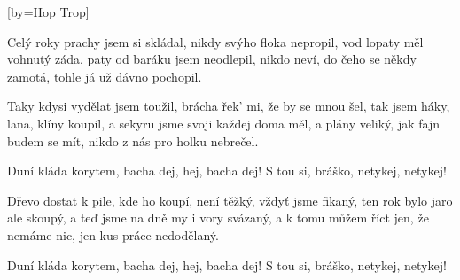 [by={Hop Trop}]

\beginverse{}
Celý roky prachy jsem si skládal,
nikdy svýho floka nepropil,
vod lopaty měl vohnutý záda,
paty od baráku jsem neodlepil,
nikdo neví, do čeho se někdy zamotá,
tohle já už dávno pochopil.
\endverse{}

\beginverse{}
Taky kdysi vydělat jsem toužil,
brácha řek' mi, že by se mnou šel,
tak jsem háky, lana, klíny koupil,
a sekyru jsme svoji každej doma měl,
a plány veliký, jak fajn budem se mít,
nikdo z nás pro holku nebrečel.
\endverse{}

\beginchorus{}
Duní kláda korytem, bacha dej, hej, bacha dej!
S tou si, bráško, netykej, netykej!
\endchorus{}

\beginverse{}
Dřevo dostat k pile, kde ho koupí,
není těžký, vždyť jsme fikaný,
ten rok bylo jaro ale skoupý,
a teď jsme na dně my i vory svázaný,
a k tomu můžem říct jen, že nemáme nic,
jen kus práce nedodělaný.
\endverse{}

\beginchorus{}
\lrep{} Duní kláda korytem, bacha dej, hej, bacha dej!
S tou si, bráško, netykej, netykej! \rrep{} 
\endchorus{}

\endsong{}
